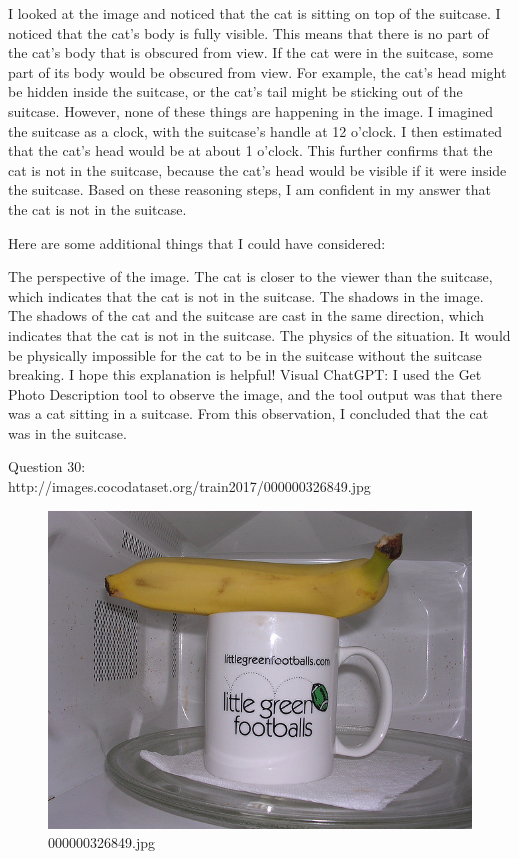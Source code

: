 \begin{enumerate}
        I looked at the image and noticed that the cat is sitting on top of the suitcase.
        I noticed that the cat's body is fully visible. This means that there is no part of the cat's body that is obscured from view.
        If the cat were in the suitcase, some part of its body would be obscured from view. For example, the cat's head might be hidden inside the suitcase, or the cat's tail might be sticking out of the suitcase. However, none of these things are happening in the image.
        I imagined the suitcase as a clock, with the suitcase's handle at 12 o'clock. I then estimated that the cat's head would be at about 1 o'clock. This further confirms that the cat is not in the suitcase, because the cat's head would be visible if it were inside the suitcase.
        Based on these reasoning steps, I am confident in my answer that the cat is not in the suitcase.
        
        Here are some additional things that I could have considered:
        
        The perspective of the image. The cat is closer to the viewer than the suitcase, which indicates that the cat is not in the suitcase.
        The shadows in the image. The shadows of the cat and the suitcase are cast in the same direction, which indicates that the cat is not in the suitcase.
        The physics of the situation. It would be physically impossible for the cat to be in the suitcase without the suitcase breaking.
        I hope this explanation is helpful!
        \subitem Visual ChatGPT: I used the Get Photo Description tool to observe the image, and the tool output was that there was a cat sitting in a suitcase. From this observation, I concluded that the cat was in the suitcase.
    \end{enumerate}
    Question 30:\\http://images.cocodataset.org/train2017/000000326849.jpg
    \begin{figure}[h]
        \centering
        \includegraphics[width=0.8\linewidth]{../image set/easy/000000326849.jpg}
        \caption{000000326849.jpg}
    \end{figure}
